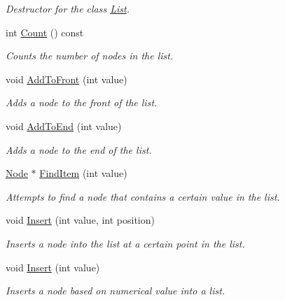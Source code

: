 \begin{DoxyCompactItemize}
\begin{DoxyCompactList}\small\item\em Destructor for the class \hyperlink{class_c_s170_1_1_list_lab_1_1_list}{List}. \end{DoxyCompactList}\item 
int \hyperlink{class_c_s170_1_1_list_lab_1_1_list_a1e53a5b39625df166f46b745545fa3a6}{Count} () const 
\begin{DoxyCompactList}\small\item\em Counts the number of nodes in the list. \end{DoxyCompactList}\item 
void \hyperlink{class_c_s170_1_1_list_lab_1_1_list_ae0d1edbf73012bb977c8e332667fb592}{Add\-To\-Front} (int value)
\begin{DoxyCompactList}\small\item\em Adds a node to the front of the list. \end{DoxyCompactList}\item 
void \hyperlink{class_c_s170_1_1_list_lab_1_1_list_a54d4c8da98dee27d5d837211b9920a88}{Add\-To\-End} (int value)
\begin{DoxyCompactList}\small\item\em Adds a node to the end of the list. \end{DoxyCompactList}\item 
\hyperlink{struct_c_s170_1_1_list_lab_1_1_node}{Node} $\ast$ \hyperlink{class_c_s170_1_1_list_lab_1_1_list_a81fbb05c8b2576d0e9eb08e56c872129}{Find\-Item} (int value)
\begin{DoxyCompactList}\small\item\em Attempts to find a node that contains a certain value in the list. \end{DoxyCompactList}\item 
void \hyperlink{class_c_s170_1_1_list_lab_1_1_list_a08c1c07a3356cfe4c6c7573b6af03eda}{Insert} (int value, int position)
\begin{DoxyCompactList}\small\item\em Inserts a node into the list at a certain point in the list. \end{DoxyCompactList}\item 
void \hyperlink{class_c_s170_1_1_list_lab_1_1_list_afe8ceeae0c4072e5955216a5018ca0ab}{Insert} (int value)
\begin{DoxyCompactList}\small\item\em Inserts a node based on numerical value into a list. \end{DoxyCompactList}\item 

\end{DoxyCompactItemize}
